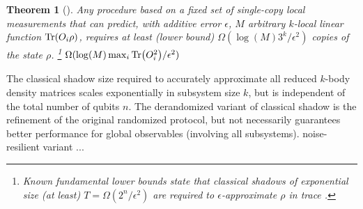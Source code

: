 \documentclass[
aps,
pra,
twocolumn,
floatfix,
]{revtex4-2}
\theoremstyle{plain}
\newtheorem{theorem}{Theorem}
\theoremstyle{definition}
\newcommand{\ob}{O}
\newcommand{\dm}{\rho}
\newcommand{\ghz}{\text{GHZ}}
\begin{document}
\begin{theorem}[\cite{huangPredictingManyProperties2020}]\label{thm:classical_shadow}
	Any procedure based on a fixed set of single-copy local measurements that can predict,
	with additive error $\epsilon$, $M$ arbitrary $k$-local linear function $\Tr(\ob_i\dm)$,
	requires at least (lower bound)
	$\Omega(\log(M) 3^k/\epsilon^2)$ copies of the state $\dm$.
	\footnote{Known fundamental lower bounds state that classical shadows of exponential size (at least) $T = \Omega( 2^n / \epsilon^2)$ are required to $\epsilon$-approximate $\dm$ in trace .}
	$\Omega(\log(M) \max_i\Tr(\ob_i^2)/\epsilon^2)$ 
\end{theorem}


The classical shadow size required to accurately approximate all reduced $k$-body density matrices scales exponentially in subsystem size $k$, but is independent of the total number of qubits $n$.
The derandomized variant of classical shadow \cite{huangEfficientEstimationPauli2021} is the refinement of the original randomized protocol, 
but not necessarily guarantees better performance for global observables (involving all subsystems).  
noise-resilient variant \cite{chenRobustShadowEstimation2021} ...


\end{document}
